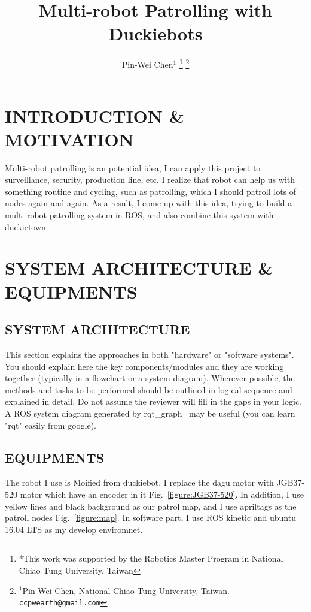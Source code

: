\documentclass[letterpaper, 10 pt, conference]{ieeeconf}  %
\title{\LARGE \bf
Multi-robot Patrolling with Duckiebots
}
\author{Pin-Wei Chen$^{1}$%
\thanks{*This work was supported by the Robotics Master Program in National Chiao Tung University, Taiwan}%
\thanks{$^{1}$Pin-Wei Chen, National Chiao Tung University, Taiwan.		{\tt\small ccpwearth@gmail.com}}%
}
\begin{document}
\maketitle
\thispagestyle{empty}
\pagestyle{empty}


\section{INTRODUCTION \& MOTIVATION}

Multi-robot patrolling is an potential idea, I can apply this project to surveillance, security, production line, etc. I realize that robot can help us with something routine and cycling, such as patrolling, which I should patroll lots of nodes again and again. As a result, I come up with this idea, trying to build a multi-robot patrolling system in ROS, and also combine this system with duckietown.

\section{SYSTEM ARCHITECTURE \& EQUIPMENTS}

\subsection{SYSTEM ARCHITECTURE}


This section explains the approaches in both "hardware" or "software systems". You should explain here the key components/modules and they are working together (typically in a flowchart or a system diagram). Wherever possible, the methods and tasks to be performed should be outlined in logical sequence and explained in detail. Do not assume the reviewer will fill in the gaps in your logic. A ROS system diagram generated by rqt\_graph~\cite{rqt-graph} may be useful (you can learn "rqt" easily from google).

\subsection{EQUIPMENTS} 

The robot I use is Moified from duckiebot, I replace the dagu motor with JGB37-520 motor which have an encoder in it Fig.~\ref{figure:JGB37-520}. In addition, I use yellow lines and black background as our patrol map, and I use apriltags as the patroll nodes Fig.~\ref{figure:map}. In software part, I use ROS kinetic and ubuntu 16.04 LTS as my develop enviromnet.
\end{document}
